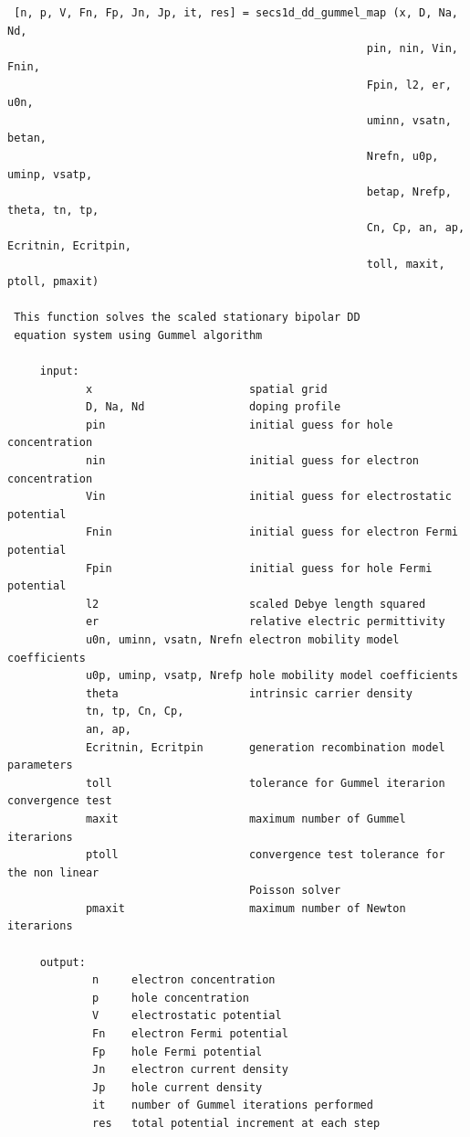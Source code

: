 \begin{verbatim}


 [n, p, V, Fn, Fp, Jn, Jp, it, res] = secs1d_dd_gummel_map (x, D, Na, Nd, 
                                                       pin, nin, Vin, Fnin, 
                                                       Fpin, l2, er, u0n, 
                                                       uminn, vsatn, betan, 
                                                       Nrefn, u0p, uminp, vsatp, 
                                                       betap, Nrefp, theta, tn, tp, 
                                                       Cn, Cp, an, ap, Ecritnin, Ecritpin, 
                                                       toll, maxit, ptoll, pmaxit)         

 This function solves the scaled stationary bipolar DD 
 equation system using Gummel algorithm

     input: 
            x                        spatial grid
            D, Na, Nd                doping profile
            pin                      initial guess for hole concentration
            nin                      initial guess for electron concentration
            Vin                      initial guess for electrostatic potential
            Fnin                     initial guess for electron Fermi potential
            Fpin                     initial guess for hole Fermi potential
            l2                       scaled Debye length squared
            er                       relative electric permittivity
            u0n, uminn, vsatn, Nrefn electron mobility model coefficients
            u0p, uminp, vsatp, Nrefp hole mobility model coefficients
            theta                    intrinsic carrier density
            tn, tp, Cn, Cp, 
            an, ap, 
            Ecritnin, Ecritpin       generation recombination model parameters
            toll                     tolerance for Gummel iterarion convergence test
            maxit                    maximum number of Gummel iterarions
            ptoll                    convergence test tolerance for the non linear
                                     Poisson solver
            pmaxit                   maximum number of Newton iterarions

     output: 
             n     electron concentration
             p     hole concentration
             V     electrostatic potential
             Fn    electron Fermi potential
             Fp    hole Fermi potential
             Jn    electron current density
             Jp    hole current density
             it    number of Gummel iterations performed
             res   total potential increment at each step


\end{verbatim}




